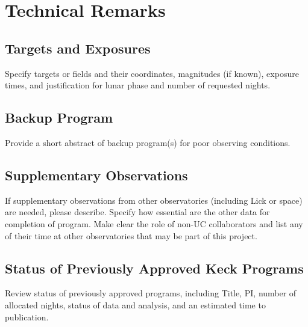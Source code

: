 \documentclass[edit]{Keck}
\begin{document}
\clearpage
\section{Technical Remarks} %
\label{sec:technical_remarks}

\subsection{Targets and Exposures} %
\label{sub:targets_and_exposures}

Specify targets or fields and their coordinates, magnitudes (if known), exposure times, and justification for lunar phase and number of requested nights.

\subsection{Backup Program} %
\label{sub:backup_program}

Provide a short abstract of backup program(s) for poor observing conditions.

\subsection{Supplementary Observations} %
\label{sub:supplementary_observations}

If supplementary observations from other observatories (including Lick or space) are needed, please describe. Specify how essential are the other data for completion of program. Make clear the role of non-UC collaborators and list any of their time at other observatories that may be part of this project.

\subsection{Status of Previously Approved Keck Programs} %
\label{sub:status_of_previously_approved_keck_programs}

Review status of previously approved programs, including Title, PI, number of allocated nights, status of data and analysis, and an estimated time to publication.


\newpage
\end{document}
